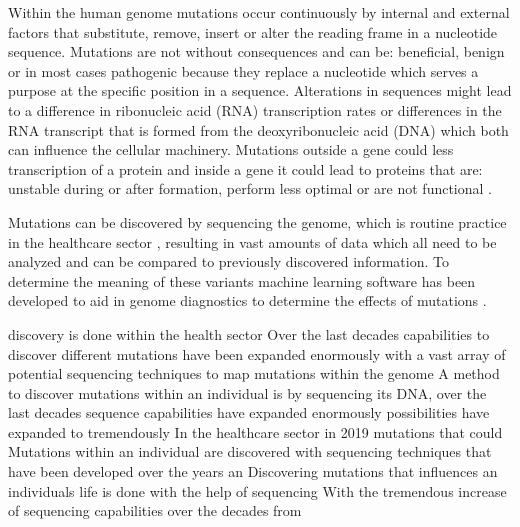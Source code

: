 Within the human genome mutations occur continuously by internal and external factors that substitute, remove, insert or alter the reading frame in a nucleotide sequence. Mutations are not without consequences and can be: beneficial, benign or in most cases pathogenic because they replace a nucleotide which serves a purpose at the specific position in a sequence. Alterations in sequences might lead to a difference in ribonucleic acid (RNA) transcription rates or differences in the RNA transcript that is formed from the deoxyribonucleic acid (DNA) which both can influence the cellular machinery. Mutations outside a gene could less transcription of a protein and inside a gene it could lead to proteins that are: unstable during or after formation, perform less optimal or are not functional \cite{}.

Mutations can be discovered by sequencing the genome, which is routine practice in the healthcare sector \cite{}, resulting in vast amounts of data which all need to be analyzed and can be compared to previously discovered information.  
To determine the meaning of these variants machine learning software has been developed to aid in genome diagnostics to determine the effects of mutations \cite{}.


 discovery is done within the health sector 
Over the last decades capabilities to discover different mutations have been expanded enormously with a vast array of potential sequencing techniques to map mutations within the genome 
A method to discover mutations within an individual is by sequencing its DNA, over the last decades sequence capabilities have expanded enormously   possibilities have expanded to tremendously 
In the healthcare sector in 2019 mutations that could 
Mutations within an individual are discovered with sequencing techniques that have been developed over the years an
Discovering mutations that influences an individuals life is done with the help of sequencing 
With the tremendous increase of sequencing capabilities over the decades from 

%


